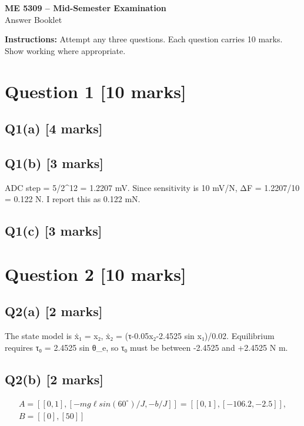 \documentclass[11pt,a4paper]{article}
\begin{document}
\begin{center}
{\Large\bfseries ME 5309 -- Mid-Semester Examination}\\[3pt]
{\large Answer Booklet}\\[8pt]
\end{center}
\textbf{Instructions:} Attempt any three questions. Each question carries 10 marks. Show working where appropriate.
\section*{Question 1 \hfill [10 marks]}
\subsection*{Q1(a) \hfill [4 marks]}

\vspace{2mm}

\subsection*{Q1(b) \hfill [3 marks]}

ADC step = 5/2\textasciicircum{}12 = 1.2207 mV.
Since sensitivity is 10 mV/N, ΔF = 1.2207/10 = 0.122 N.
I report this as 0.122 mN.

\subsection*{Q1(c) \hfill [3 marks]}

\vspace{2mm}

\section*{Question 2 \hfill [10 marks]}
\subsection*{Q2(a) \hfill [2 marks]}

The state model is ẋ₁ = x₂, ẋ₂ = (τ-0.05x₂-2.4525 sin x₁)/0.02.
Equilibrium requires τ₀ = 2.4525 sin θ\_e, so τ₀ must be between -2.4525 and +2.4525 N m.

\subsection*{Q2(b) \hfill [2 marks]}

\[\begin{aligned}A = [[0,1], [-mg\ell sin(60^{\circ})/J, -b/J]] = [[0,1], [-106.2, -2.5]],\\ B = [[0],[50]]\end{aligned}\]
\end{document}
